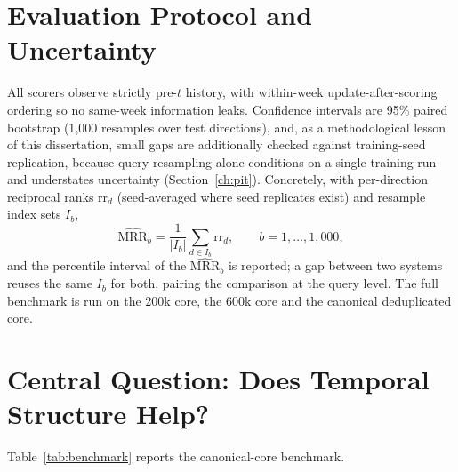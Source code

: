 \documentclass[a4paper,12pt]{report}
\begin{document}
\section{Evaluation Protocol and Uncertainty}
All scorers observe strictly pre-$t$ history, with within-week
update-after-scoring ordering so no same-week information leaks. Confidence
intervals are 95\% paired bootstrap \citep{Efron1979Bootstrap} (1{,}000
resamples over test directions),
and, as a methodological lesson of this dissertation, small gaps are
additionally checked against training-seed replication, because query
resampling alone conditions on a single training run and understates
uncertainty (Section~\ref{ch:pit}). Concretely, with per-direction
reciprocal ranks $\mathrm{rr}_d$ (seed-averaged where seed replicates
exist) and resample index sets $I_b$,
\begin{equation}
\widehat{\mathrm{MRR}}_b = \frac{1}{|I_b|} \sum_{d \in I_b}
\mathrm{rr}_d, \qquad b = 1, \dots, 1{,}000,
\label{eq:bootstrap}
\end{equation}
and the percentile interval of the $\widehat{\mathrm{MRR}}_b$ is reported;
a gap between two systems reuses the same $I_b$ for both, pairing the
comparison at the query level. The full benchmark is run on the 200k
core, the 600k core and the canonical deduplicated core.

\section{Central Question: Does Temporal Structure Help?}
Table~\ref{tab:benchmark} reports the canonical-core benchmark.

\begin{table}[ht]
\centering
\caption{Link-prediction benchmark on the canonical deduplicated core
(raw ranking; 95\% bootstrap CIs in brackets where computed).}
\label{tab:benchmark}
%
\end{table}
\end{document}
